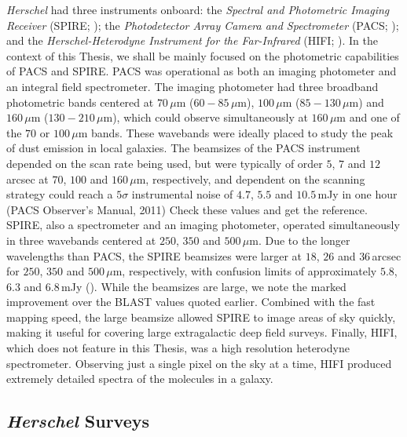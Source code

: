\textit{Herschel} had three instruments onboard: the \textit{Spectral and Photometric Imaging Receiver} (SPIRE; \citealt{Griffin_2010}); the \textit{Photodetector Array Camera and Spectrometer} (PACS; \citealt{Poglitsch_2010}); and the \textit{Herschel-Heterodyne Instrument for the Far-Infrared} (HIFI; \citealt{deGraauw_2010}). In the context of this Thesis, we shall be mainly focused on the photometric capabilities of PACS and SPIRE. PACS was operational as both an imaging photometer and an integral field spectrometer. The imaging photometer had three broadband photometric bands centered at $70\,\mu$m ($60 - 85\,\mu$m), $100\,\mu$m ($85 - 130\,\mu$m) and $160\,\mu$m ($130 - 210\,\mu$m), which could observe simultaneously at $160\,\mu$m and one of the $70$ or $100\,\mu$m bands. These wavebands were ideally placed to study the peak of dust emission in local galaxies. The beamsizes of the PACS instrument depended on the scan rate being used, but were typically of order $5$, $7$ and $12\,$arcsec at $70$, $100$ and $160\,\mu$m, respectively, and dependent on the scanning strategy could reach a $5\sigma$ instrumental noise of $4.7$, $5.5$ and $10.5\,$mJy in one hour (PACS Observer's Manual, 2011) {\color{red}Check these values and get the reference}. SPIRE, also a spectrometer and an imaging photometer, operated simultaneously in three wavebands centered at $250$, $350$ and $500\,\mu$m. Due to the longer wavelengths than PACS, the SPIRE beamsizes were larger at $18$, $26$ and $36\,$arcsec for $250$, $350$ and $500\,\mu$m, respectively, with confusion limits of approximately $5.8$, $6.3$ and $6.8\,$mJy (\citealt{Casey_2014b}). While the beamsizes are large, we note the marked improvement over the BLAST values quoted earlier. Combined with the fast mapping speed, the large beamsize allowed SPIRE to image areas of sky quickly, making it useful for covering large extragalactic deep field surveys. Finally, HIFI, which does not feature in this Thesis, was a high resolution heterodyne spectrometer. Observing just a single pixel on the sky at a time, HIFI produced extremely detailed spectra of the molecules in a galaxy.

\subsection{\textit{Herschel} Surveys}


